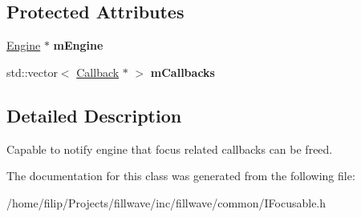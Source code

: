 \subsection*{Protected Attributes}
\begin{DoxyCompactItemize}
\item 
\hyperlink{classflw_1_1Engine}{Engine} $\ast$ {\bfseries m\+Engine}\hypertarget{classflw_1_1flf_1_1IFocusable_a625d091b86ce2a676862a4dd603ffe8a}{}\label{classflw_1_1flf_1_1IFocusable_a625d091b86ce2a676862a4dd603ffe8a}

\item 
std\+::vector$<$ \hyperlink{classflw_1_1flf_1_1Callback}{Callback} $\ast$ $>$ {\bfseries m\+Callbacks}\hypertarget{classflw_1_1flf_1_1IFocusable_ab1e12a3db45e6f1ef06f661514103845}{}\label{classflw_1_1flf_1_1IFocusable_ab1e12a3db45e6f1ef06f661514103845}

\end{DoxyCompactItemize}


\subsection{Detailed Description}
Capable to notify engine that focus related callbacks can be freed. 

The documentation for this class was generated from the following file\+:\begin{DoxyCompactItemize}
\item 
/home/filip/\+Projects/fillwave/inc/fillwave/common/I\+Focusable.\+h\end{DoxyCompactItemize}
